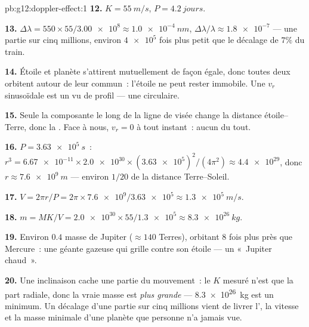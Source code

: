 \begin{solution}{pb:g12:doppler-effect:1}
\textbf{12.} $K = \qty{55}{m/s}$, $P = \qty{4.2}{jours}$.

\textbf{13.} $\Delta\lambda = 550 \times 55/\num{3.00e8} \approx \qty{1.0e-4}{nm}$,
$\Delta\lambda/\lambda \approx \num{1.8e-7}$ --- une partie sur cinq millions, environ
$\num{4e5}$ fois plus petit que le décalage de $7\%$ du train.

\textbf{14.} Étoile et planète s'attirent mutuellement de façon égale, donc toutes deux
orbitent autour de leur  commun~: l'étoile ne
peut rester immobile. Une $v_r$ sinusoïdale est un  vu de profil --- une  circulaire.

\textbf{15.} Seule la composante le long de la ligne de visée change la distance
étoile--Terre, donc la . Face à nous,
$v_r = 0$ à tout instant~: aucun  du tout.

\textbf{16.} $P = \qty{3.63e5}{s}$~: $r^3 = \num{6.67e-11} \times \num{2.0e30} \times
(\num{3.63e5})^2/(4\pi^2) \approx \num{4.4e29}$, donc $r \approx \qty{7.6e9}{m}$ ---
environ $1/20$ de la distance Terre--Soleil.

\textbf{17.} $V = 2\pi r/P = 2\pi \times \num{7.6e9}/\num{3.63e5} \approx
\qty{1.3e5}{m/s}$.

\textbf{18.} $m = M K/V = \num{2.0e30} \times 55/\num{1.3e5} \approx \qty{8.3e26}{kg}$.

\textbf{19.} Environ $0.4$ masse de Jupiter ($\approx 140$ Terres), orbitant $8$ fois plus
près que Mercure~: une géante gazeuse qui grille contre son étoile --- un «~Jupiter
chaud~».

\textbf{20.} Une inclinaison cache une partie du mouvement~: le $K$ mesuré n'est que la
part radiale, donc la vraie masse est \emph{plus grande} --- \qty{8.3e26}{kg} est un
minimum. Un décalage  d'une partie sur cinq millions vient de
livrer l', la vitesse et la masse minimale d'une planète
que personne n'a jamais vue.
\end{solution}
